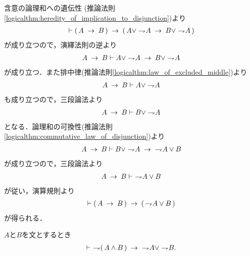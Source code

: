	\begin{prf}
		含意の論理和への遺伝性
		(推論法則\ref{logicalthm:heredity_of_implication_to_disjunction})より
		\begin{align}
			\vdash (\, A \rarrow B\, ) 
			\rarrow (\, A \vee \negation A \rarrow B \vee \negation A\, )
		\end{align}
		が成り立つので，演繹法則の逆より
		\begin{align}
			A \rarrow B \vdash A \vee \negation A \rarrow B \vee \negation A
		\end{align}
		が成り立つ．また排中律(推論法則\ref{logicalthm:law_of_excluded_middle})より
		\begin{align}
			A \rarrow B \vdash A \vee \negation A
		\end{align}
		も成り立つので，三段論法より
		\begin{align}
			A \rarrow B \vdash B \vee \negation A
		\end{align}
		となる．論理和の可換性(推論法則\ref{logicalthm:commutative_law_of_disjunction})より
		\begin{align}
			A \rarrow B \vdash B \vee \negation A \rarrow\ \negation A \vee B
		\end{align}
		が成り立つので，三段論法より
		\begin{align}
			A \rarrow B \vdash\ \negation A \vee B
		\end{align}
		が従い，演算規則より
		\begin{align}
			\vdash (\, A \rarrow B\, ) \rarrow (\, \negation A \vee B\, )
		\end{align}
		が得られる．
		\QED
	\end{prf}
	
	\begin{screen}
		\begin{logicalthm}
		\label{logicalthm:strong_De_Morgan_law_2}
			$A$と$B$を文とするとき
			\begin{align}
				\vdash\ \negation (\, A \wedge B\, )
				\rarrow\ \negation A \vee \negation B.
			\end{align}
		\end{logicalthm}
	\end{screen}
	
